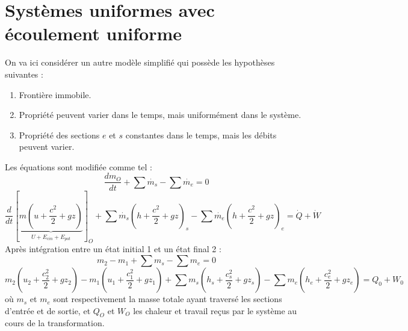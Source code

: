 \section{Systèmes uniformes avec écoulement uniforme}
On va ici considérer un autre modèle simplifié qui possède les hypothèses 
suivantes :
\begin{enumerate}
\item Frontière immobile.
\item Propriété peuvent varier dans le temps, mais uniformément dans le 
système.
\item Propriété des sections $e$ et $s$ constantes dans le temps, mais les 
débits peuvent varier.
\end{enumerate}
Les équations sont modifiée comme tel :
\begin{equation}
\frac{dm_O}{dt} + \sum \dot{m_s}-\sum \dot{m_e}=0
\end{equation}
\begin{equation}
\frac{d}{dt}\left[\underbrace{m\left(u+\frac{c^2}{2}+gz\right)}_{U+E_{cin}+
E_{pot}}\right]_O + \sum\dot{m_s}\left(h+\frac{c^2}{2}+gz\right)_s-
\sum\dot{m_e}\left(h+\frac{c^2}{2}+gz\right)_e = \dot{Q}+\dot{W}
\end{equation}
Après intégration entre un état initial 1 et un état final 2 : 
\begin{equation}
m_2-m_1 + \sum m_s - \sum m_e = 0
\end{equation}
\begin{equation}
m_2\left(u_2+\frac{c_2^2}{2}+gz_2\right)-m_1\left(u_1+\frac{c_1^2}{2}+gz_1
\right)+\sum m_s\left(h_s+\frac{c_s^2}{2}+gz_s\right)-\sum m_e\left(h_e+\frac{
c_e^2}{2}+gz_e\right) = Q_0+W_0
\end{equation}
où $m_s$ et $m_e$ sont respectivement la masse totale ayant traversé les sections
d’entrée et de sortie, et $Q_O$ et $W_O$ les chaleur et travail reçus par le système au
cours de la transformation.













